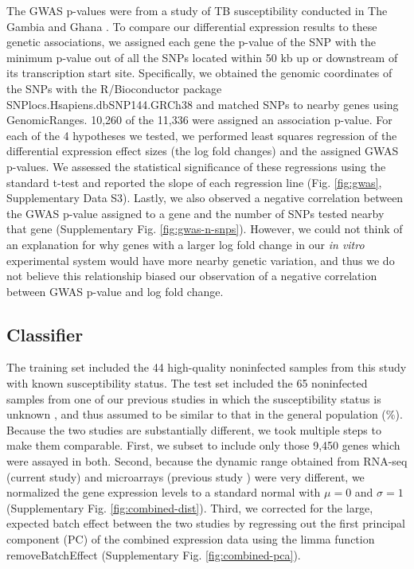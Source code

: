\documentclass[fleqn,10pt]{wlscirep}
\begin{document}
The GWAS p-values were from a study of TB susceptibility conducted in
The Gambia and Ghana \cite{Thye2010}. To compare our differential
expression results to these genetic associations, we assigned each
gene the p-value of the SNP with the minimum p-value out of all the
SNPs located within 50 kb up or downstream of its transcription start
site. Specifically, we obtained the genomic coordinates of the SNPs
with the R/Bioconductor package SNPlocs.Hsapiens.dbSNP144.GRCh38 and
matched SNPs to nearby genes using GenomicRanges. 10,260 of the 11,336
were assigned an association p-value. For each of the 4 hypotheses we
tested, we performed least squares regression of the differential
expression effect sizes (the log fold changes) and the assigned GWAS
p-values. We assessed the statistical significance of these
regressions using the standard t-test and reported the slope of each
regression line (Fig. \ref{fig:gwas}, Supplementary Data S3).  Lastly,
we also observed a negative correlation between the GWAS p-value
assigned to a gene and the number of SNPs tested nearby that gene
(Supplementary Fig. \ref{fig:gwas-n-snps}). However, we could not
think of an explanation for why genes with a larger log fold change in
our \emph{in vitro} experimental system would have more nearby genetic
variation, and thus we do not believe this relationship biased our
observation of a negative correlation between GWAS p-value and log
fold change.
\subsection*{Classifier}

The training set included the 44 high-quality noninfected samples from
this study with known susceptibility status. The test set included the
65 noninfected samples from one of our previous studies in which the
susceptibility status is unknown \cite{Barreiro2012}, and thus assumed
to be similar to that in the general population (\%).
Because the two studies are substantially different, we took multiple
steps to make them comparable. First, we subset to include only those
9,450 genes which were assayed in both. Second, because the dynamic
range obtained from RNA-seq (current study) and microarrays (previous
study \cite{Barreiro2012}) were very different, we normalized the gene
expression levels to a standard normal with $\mu = 0$ and $\sigma = 1$
(Supplementary Fig. \ref{fig:combined-dist}). Third, we corrected for
the large, expected batch effect between the two studies by regressing
out the first principal component (PC) of the combined expression data
using the limma function removeBatchEffect \cite{Ritchie2015}
(Supplementary Fig. \ref{fig:combined-pca}).
\end{document}
